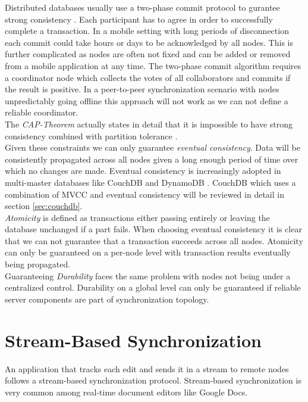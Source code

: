 Distributed databases usually use a two-phase commit protocol to gurantee strong consistency \cite{bernstein1987concurrency}.
Each participant has to agree in order to successfully complete a transaction.
In a mobile setting with long periods of disconnection each commit could take hours or days to be acknowledged by all nodes.
This is further complicated as nodes are often not fixed and can be added or removed from a mobile application at any time.
The two-phase commit algorithm requires a coordinator node which collects the votes of all collaborators and commits if the result is positive.
In a peer-to-peer synchronization scenario with nodes unpredictably going offline this approach will not work as we can not define a reliable coordinator.\\
The \emph{CAP-Theorem} actually states in detail that it is impossible to have strong consistency combined with partition tolerance \cite{Gilbert:2002uw}.\\
Given these constraints we can only guarantee \emph{eventual consistency}.
Data will be consistently propagated across all nodes given a long enough period of time over which no changes are made.
Eventual consistency is increasingly adopted in multi-master databases like CouchDB \cite{anderson2010couchdb} and DynamoDB \cite{DeCandia:2007ui}.
CouchDB which uses a combination of MVCC and eventual consistency will be reviewed in detail in section \ref{sec:couchdb}.\\
\emph{Atomicity} is defined as transactions either passing entirely or leaving the database unchanged if a part fails.
When choosing eventual consistency it is clear that we can not guarantee that a transaction succeeds across all nodes.
Atomicity can only be guaranteed on a per-node level with transaction results eventually being propagated.\\
Guaranteeing \emph{Durability} faces the same problem with nodes not being under a centralized control.
Durability on a global level can only be guaranteed if reliable server components are part of synchronization topology.

\section{Stream-Based Synchronization}
\label{sec:background.stream-based}
An application that tracks each edit and sends it in a stream to remote nodes follows a stream-based synchronization protocol.
Stream-based synchronization is very common among real-time document editors like Google Docs.\\

